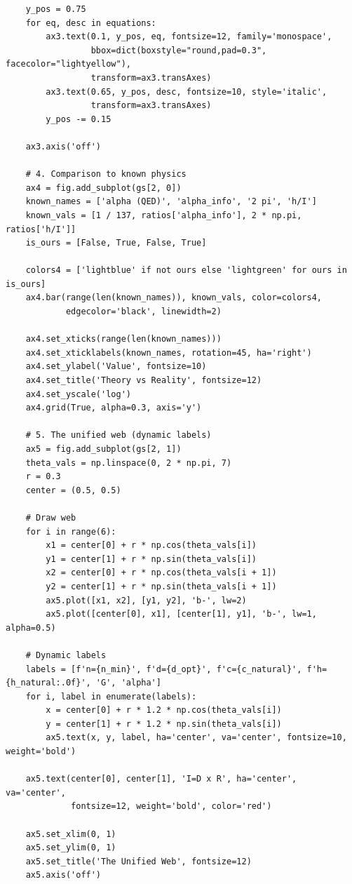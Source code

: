 \documentclass{article}
\begin{document}
\begin{verbatim}
    y_pos = 0.75
    for eq, desc in equations:
        ax3.text(0.1, y_pos, eq, fontsize=12, family='monospace',
                 bbox=dict(boxstyle="round,pad=0.3", facecolor="lightyellow"),
                 transform=ax3.transAxes)
        ax3.text(0.65, y_pos, desc, fontsize=10, style='italic',
                 transform=ax3.transAxes)
        y_pos -= 0.15
    
    ax3.axis('off')
    
    # 4. Comparison to known physics
    ax4 = fig.add_subplot(gs[2, 0])
    known_names = ['alpha (QED)', 'alpha_info', '2 pi', 'h/I']
    known_vals = [1 / 137, ratios['alpha_info'], 2 * np.pi, ratios['h/I']]
    is_ours = [False, True, False, True]
    
    colors4 = ['lightblue' if not ours else 'lightgreen' for ours in is_ours]
    ax4.bar(range(len(known_names)), known_vals, color=colors4,
            edgecolor='black', linewidth=2)
    
    ax4.set_xticks(range(len(known_names)))
    ax4.set_xticklabels(known_names, rotation=45, ha='right')
    ax4.set_ylabel('Value', fontsize=10)
    ax4.set_title('Theory vs Reality', fontsize=12)
    ax4.set_yscale('log')
    ax4.grid(True, alpha=0.3, axis='y')
    
    # 5. The unified web (dynamic labels)
    ax5 = fig.add_subplot(gs[2, 1])
    theta_vals = np.linspace(0, 2 * np.pi, 7)
    r = 0.3
    center = (0.5, 0.5)
    
    # Draw web
    for i in range(6):
        x1 = center[0] + r * np.cos(theta_vals[i])
        y1 = center[1] + r * np.sin(theta_vals[i])
        x2 = center[0] + r * np.cos(theta_vals[i + 1])
        y2 = center[1] + r * np.sin(theta_vals[i + 1])
        ax5.plot([x1, x2], [y1, y2], 'b-', lw=2)
        ax5.plot([center[0], x1], [center[1], y1], 'b-', lw=1, alpha=0.5)
    
    # Dynamic labels
    labels = [f'n={n_min}', f'd={d_opt}', f'c={c_natural}', f'h={h_natural:.0f}', 'G', 'alpha']
    for i, label in enumerate(labels):
        x = center[0] + r * 1.2 * np.cos(theta_vals[i])
        y = center[1] + r * 1.2 * np.sin(theta_vals[i])
        ax5.text(x, y, label, ha='center', va='center', fontsize=10, weight='bold')
    
    ax5.text(center[0], center[1], 'I=D x R', ha='center', va='center',
             fontsize=12, weight='bold', color='red')
    
    ax5.set_xlim(0, 1)
    ax5.set_ylim(0, 1)
    ax5.set_title('The Unified Web', fontsize=12)
    ax5.axis('off')
    

\end{verbatim}
\end{document}
